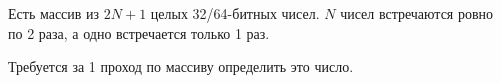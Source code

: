 \begin{problem}

Есть массив из $2N+1$ целых 32/64-битных чисел. $N$ чисел встречаются ровно по 2
раза, а одно встречается только 1 раз.

Требуется за 1 проход по массиву определить это число.
\end{problem}
